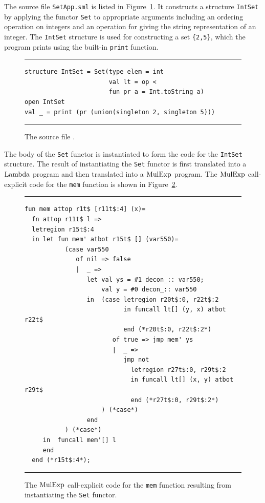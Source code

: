 \documentclass[12pt]{book}
\begin{document}
The source file {\tt SetApp.sml} is listed in
Figure~\ref{SetApp.fig}. It constructs a structure {\tt IntSet} by
applying the functor {\tt Set} to appropriate arguments including an
ordering operation on integers and an operation for giving the string
representation of an integer. The {\tt IntSet} structure is used for
constructing a set \verb+{2,5}+, which the program prints using the
built-in {\tt print} function.
\begin{figure}[ht]
\hrule \medskip
\begin{verbatim}
structure IntSet = Set(type elem = int
                       val lt = op <
                       fun pr a = Int.toString a)
open IntSet
val _ = print (pr (union(singleton 2, singleton 5)))
\end{verbatim}
\caption{The source file .}
\medskip \hrule \label{SetApp.fig} 
\end{figure}

The body of the {\tt Set} functor is instantiated to form the code for
the {\tt IntSet} structure. The result of instantiating the {\tt Set}
functor is first translated into a $\hbox{\rm Lambda}$ program and then
translated into a $\hbox{\rm MulExp}$ program. The $\hbox{\rm MulExp}$ call-explicit code for the {\tt mem} function is shown in
Figure~\ref{set_inst_mulexp.fig}.
\begin{figure}[ht]
\hrule \medskip
\begin{verbatim}
fun mem attop r1t$ [r11t$:4] (x)= 
  fn attop r11t$ l => 
  letregion r15t$:4 
  in let fun mem' atbot r15t$ [] (var550)= 
           (case var550 
              of nil => false
              |  _ => 
                 let val ys = #1 decon_:: var550; 
                     val y = #0 decon_:: var550
                 in  (case letregion r20t$:0, r22t$:2 
                           in funcall lt[] (y, x) atbot r22t$ 
                           end (*r20t$:0, r22t$:2*)
                        of true => jmp mem' ys
                        |  _ => 
                           jmp not 
                             letregion r27t$:0, r29t$:2 
                             in funcall lt[] (x, y) atbot r29t$ 
                             end (*r27t$:0, r29t$:2*)
                     ) (*case*) 
                 end 
           ) (*case*) 
     in  funcall mem'[] l
     end  
  end (*r15t$:4*); 
\end{verbatim}
\caption{The $\hbox{\rm MulExp}$ call-explicit code for the {\tt mem} function resulting 
from instantiating the {\tt Set} functor.}
\medskip \hrule \label{set_inst_mulexp.fig} 
\end{figure}
\end{document}
